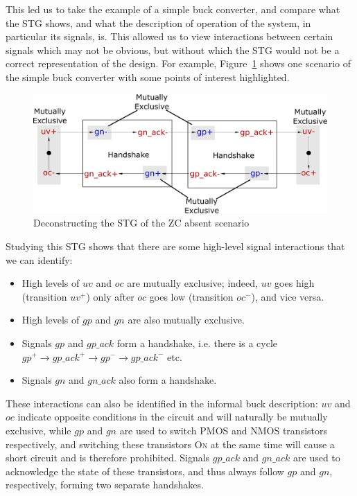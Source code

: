 \documentclass[british,compsoc]{IEEEtran}
\newcommand{\noun}[1]{\textsc{#1}}
\begin{document}
This led us to take the example of a simple buck converter, and compare what
the STG shows, and what the description of operation of the system, in
particular its signals, is. This allowed us to view interactions between
certain signals which may not be obvious, but without which the STG would not
be a correct representation of the design. For example,
Figure~\ref{fig:stg-breakdown} shows one scenario of the simple buck converter
with some points of interest highlighted.

\begin{figure}[t]
\begin{centering}
\includegraphics[scale=0.225]{Images/stg-breakdown}
\par
\protect\caption{\label{fig:stg-breakdown}Deconstructing the STG of the ZC absent scenario}
\par\end{centering}
\vspace{-4mm}
\end{figure}

Studying this STG shows that there are some high-level signal interactions that
we can identify:
\begin{itemize}
\item High levels of $uv$ and $oc$ are mutually exclusive; indeed, $uv$ goes
high (transition $uv^{+}$) only after $oc$ goes low (transition $oc^{-}$), and vice
versa.
\item High levels of $gp$ and $gn$ are also mutually exclusive.
\item Signals $gp$ and $gp\_ack$ form a handshake, i.e. there is a cycle
$gp^{+} \rightarrow gp\_ack^{+} \rightarrow gp^{-} \rightarrow gp\_ack^{-}$ etc.
\item Signals $gn$ and $gn\_ack$ also form a handshake.
\end{itemize}

These interactions can also be identified in the informal buck description:
$uv$ and $oc$ indicate opposite conditions in the circuit and will naturally be
mutually exclusive, while $gp$ and $gn$ are used to switch PMOS and NMOS
transistors respectively, and switching these transistors \noun{On} at the same
time will cause a short circuit and is therefore prohibited. Signals $gp\_ack$
and $gn\_ack$ are used to acknowledge the state of these transistors, and thus
always follow $gp$ and $gn$, respectively, forming two separate handshakes.
\end{document}

